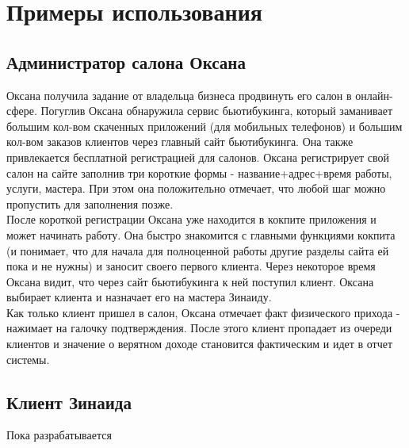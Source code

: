 \documentclass[DIV=calc, paper=a4, fontsize=11pt]{scrartcl} %
\begin{document}
\section{Примеры использования}



\begin{framed}
    \subsection{Администратор салона Оксана}
    Оксана получила задание от владельца бизнеса продвинуть его салон в онлайн-сфере. Погуглив Оксана обнаружила сервис бьютибукинга, который заманивает большим кол-вом скаченных приложений (для мобильных телефонов) и большим кол-вом заказов клиентов через главный сайт бьютибукинга. Она также привлекается бесплатной регистрацией для салонов. Оксана регистрирует свой салон на сайте заполнив три короткие формы - название+адрес+время работы, услуги, мастера. При этом она положительно отмечает, что любой шаг можно пропустить для заполнения позже. 
    \\[0.5cm]
    После короткой регистрации Оксана уже находится в кокпите приложения и может начинать работу. Она быстро знакомится с главными функциями кокпита (и понимает, что для начала для полноценной работы другие разделы сайта ей пока и не нужны) и заносит своего первого клиента. Через некоторое время Оксана видит, что через сайт бьютибукинга к ней поступил клиент. Оксана выбирает клиента и назначает его на мастера Зинаиду. 
    \\[0.5cm]
    Как только клиент пришел в салон, Оксана отмечает факт физического прихода - нажимает на галочку подтверждения. После этого клиент пропадает из очереди клиентов и значение о верятном доходе становится фактическим и идет в отчет системы.
    
\end{framed}

\begin{framed}
    \subsection{Клиент Зинаида}
    Пока разрабатывается
\end{framed}
\end{document}
